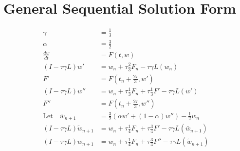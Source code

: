 \documentclass[11pt]{article}
\begin{document}
\section{General Sequential Solution Form}
\begin{equation}\begin{aligned}
  \gamma &= \frac{1}{3} \\
  \alpha &= \frac{3}{2} \\
  \frac{dw}{dt} &= F(t,w) \\
  (I - \tau \gamma L)w' &= w_n + \tau \frac{2}{3} F_n - \tau \gamma L(w_n) \\
  F'  &= F\left(t_n + \frac{2\tau}{3},w'\right) \\
  (I - \tau \gamma L)w'' &= w_n + \tau \frac{1}{3} F_n + \tau \frac{1}{3} F' - \tau \gamma L(w') \\
  F'' &= F\left(t_n + \frac{2\tau}{3},w''\right) \\
  \text{Let} \quad \bar{w}_{n+1} &= \frac{3}{2} (\alpha w' + (1-\alpha) w'') - \frac{1}{2} w_n \\
  (I-\tau \gamma L)\tilde{w}_{n+1} &= w_n+ \tau \frac{1}{4} F_n + \tau \frac{3}{4} F'  - \tau \gamma L(\bar{w}_{n+1}) \\
  (I - \tau \gamma L)w_{n+1} &= w_n + \tau \frac{1}{4} F_n + \tau \frac{3}{4} F'' - \tau \gamma L(\tilde{w}_{n+1}) \\
\end{aligned}\end{equation}


\newpage
\end{document}
